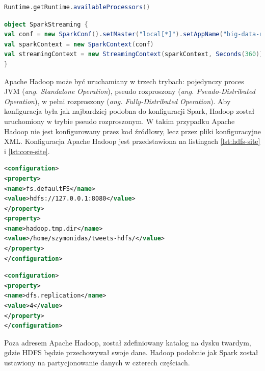 \begin{lstlisting}[language=scala, caption={Metoda zwracająca liczbę dostępnych wątków wirtualnej maszyny Java},captionpos=b, label={lst:jvm-threads-access}]
Runtime.getRuntime.availableProcessors() 
\end{lstlisting}
\begin{lstlisting}[language=scala, caption={Konfigracja klastra dla Apache Spark},captionpos=b, label={lst:spark-cluster-config}]
object SparkStreaming {
val conf = new SparkConf().setMaster("local[*]").setAppName("big-data-runner-spark-driver-application")
val sparkContext = new SparkContext(conf)
val streamingContext = new StreamingContext(sparkContext, Seconds(360))
}
\end{lstlisting} 
Apache Hadoop może być uruchamiany w trzech trybach: pojedynczy proces JVM (\textit{ang. Standalone Operation}), pseudo rozproszony (\textit{ang. Pseudo-Distributed Operation}), w pełni rozproszony (\textit{ang. Fully-Distributed Operation}). Aby konfiguracja była jak najbardziej podobna do konfiguracji Spark, Hadoop został uruchomiony w trybie pseudo rozproszonym. W takim przypadku Apache Hadoop nie jest konfigurowany przez kod źródłowy, lecz przez pliki konfiguracyjne XML. Konfiguracja Apache Hadoop jest przedstawiona na listingach \ref{lst:hdfs-site} i \ref{lst:core-site}.
\begin{lstlisting}[language=XML, label={lst:core-site}, captionpos=b, caption={Konfigracja Apache Hadoop dla trybu pseudo rozproszonego. Plik core-site.xml}, float]
<configuration>
<property>
<name>fs.defaultFS</name>
<value>hdfs://127.0.0.1:8080</value>
</property>
<property>
<name>hadoop.tmp.dir</name>
<value>/home/szymonidas/tweets-hdfs/</value>
</property>
</configuration>
\end{lstlisting}
\begin{lstlisting}[language=XML, label={lst:hdfs-site},captionpos=b, caption={Konfigracja Apache Hadoop dla trybu pseudo rozproszonego. Plik hdfs-site.xml}]
<configuration>
<property>
<name>dfs.replication</name>
<value>4</value>
</property>
</configuration>
\end{lstlisting}
Poza adresem Apache Hadoop, został zdefiniowany katalog na dysku twardym, gdzie HDFS będzie przechowywał swoje dane. Hadoop podobnie jak Spark został ustawiony na partycjonowanie danych w czterech częściach.
